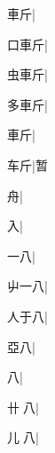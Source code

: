 \begin{multicols}{2}
{{車斤}\mktsJzrVerticalBar{}{\cjk{}{\cnsym{}　}{\cnsym{}　}{\cnsym{}　}}|{}\par
{\cjk{}口車斤}\mktsJzrVerticalBar{}{\cjk{}{\cnsym{}　}{\cnsym{}　}{\cnsym{}　}}|{}\par
{\cjk{}虫車斤}\mktsJzrVerticalBar{}{\cjk{}{\cnsym{}　}{\cnsym{}　}{\cnsym{}　}}|{}\par
{\cjk{}多車斤}\mktsJzrVerticalBar{}{\cjk{}{\cnsym{}　}{\cnsym{}　}{\cnsym{}　}}|{}\par
{車斤}\mktsJzrVerticalBar{}{\cjk{}{\cnsym{}　}{\cnsym{}　}{\cnsym{}　}}|{}\par
{\cjk{}{\cnsym{}　}车斤}\mktsJzrVerticalBar{}{\cjk{}{\cnsym{}　}{\cnsym{}　}{\cnsym{}　}}|{\cjk{}暂}\par
{\cjk{}{\cnsym{}　}{\cnsym{}　}舟}\mktsJzrVerticalBar{}{\cjk{}{\cnsym{}　}{\cnsym{}　}{\cnsym{}　}}|{}\par
{\cjk{}{\cnsym{}　}{\cnsym{}　}入}\mktsJzrVerticalBar{}{\cjk{}{\cnsym{}　}{\cnsym{}　}{\cnsym{}　}}|{}\par
{\cjk{}{\cnsym{}　}一八}\mktsJzrVerticalBar{}{\cjk{}{\cnsym{}　}{\cnsym{}　}{\cnsym{}　}}|{}\par
{\cjk{}屮一八}|{}\par
{\cjk{}人于八}|{}\par
{\cjk{}{\cnsym{}　}亞八}\mktsJzrVerticalBar{}{\cjk{}{\cnsym{}　}{\cnsym{}　}{\cnsym{}　}}|{}\par
{八}\mktsJzrVerticalBar{}{\cjk{}{\cnsym{}　}{\cnsym{}　}{\cnsym{}　}}|{}\par
{\cjk{}卄{\cnjzr{}}八}\mktsJzrVerticalBar{}{\cjk{}{\cnsym{}　}{\cnsym{}　}{\cnsym{}　}}|{}\par
{\cjk{}儿{\cnjzr{}}八}|{}\par
}
\end{multicols}
